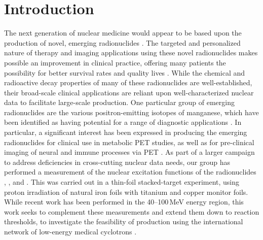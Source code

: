 
\section{\label{sec:intro_fe}Introduction}



The next generation of nuclear medicine would appear to be based upon the production of novel, emerging radionuclides \cite{Qaim201731}. 
The targeted and personalized nature of therapy and imaging applications using these novel radionuclides  makes possible an improvement in clinical practice, offering many patients the possibility for better survival rates and quality lives \cite{Mulford2005,Muller2014}.
While the chemical and radioactive decay properties of many of these radionuclides are well-established, their broad-scale  clinical applications are reliant upon well-characterized nuclear data to facilitate large-scale   production. 
% 
% 
% 
One particular group of  emerging radionuclides are the various positron-emitting isotopes of manganese, which have been identified as having potential for a range of diagnostic applications \cite{J.2013,Graves2015,Lewis2015,PhysRevC.96.014613,Wooten2017,Hernandez2017}.
In particular, a significant interest has been expressed in producing the emerging radionuclides  for clinical use in metabolic PET studies, as well as   for pre-clinical imaging of neural and immune processes via PET \cite{Graves2016}. 
As part of a larger campaign to address deficiencies in cross-cutting nuclear data needs, our group has performed a   measurement of the   nuclear excitation functions of the radionuclides ,   , and .
This was carried out in a  thin-foil stacked-target experiment, using proton irradiation of natural iron foils with titanium and copper monitor foils.
While recent work has been performed in the 40--100\,MeV energy region, this work seeks to complement these measurements and extend them down to reaction thresholds, to investigate the feasibility of production using the international network   of low-energy medical cyclotrons   \cite{Graves2016}. 


